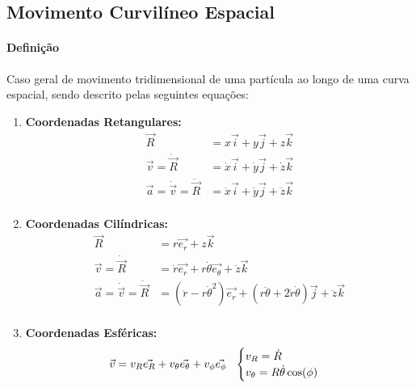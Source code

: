 \documentclass{article}
\begin{document}
        \subsection{Movimento Curvilíneo Espacial}
            \paragraph{Definição}Caso geral de movimento tridimensional de uma partícula ao longo de uma curva espacial, sendo descrito pelas seguintes equações:
                \begin{enumerate}[noitemsep]
                    \item \textbf{Coordenadas Retangulares:}
                        \begin{align*}
                            \vec{R} &= x\vec{i} + y\vec{j} + z\vec{k}\\
                            \vec{v} = \dot{\vec{R}} &= \dot{x}\vec{i} + \dot{y}\vec{j} + \dot{z}\vec{k}\\
                            \vec{a} = \dot{\vec{v}} = \ddot{\vec{R}} &= \ddot{x}\vec{i} + \ddot{y}\vec{j} + \ddot{z}\vec{k}\\
                        \end{align*}
                    \item \textbf{Coordenadas Cilíndricas:}
                        \begin{align*}
                            \vec{R} &= r\vec{e_{r}} + z\vec{k}\\
                            \vec{v} = \dot{\vec{R}} &= \dot{r}\vec{e_{r}} + r\dot{\theta}\vec{e_{\theta}} + \dot{z}\vec{k}\\
                            \vec{a} = \dot{\vec{v}} = \ddot{\vec{R}} &= (\ddot{r} - r\dot{\theta}^{2})\vec{e_{r}} + (r\ddot{\theta} + 2\dot{r}\dot{\theta})\vec{j} + \ddot{z}\vec{k}\\
                        \end{align*}
                    \item \textbf{Coordenadas Esféricas:}
                        \[
                            \vec{v} = v_{R}\vec{e_{R}} + v_{\theta}\vec{e_{\theta}} + v_{\phi}\vec{e_{\phi}}
                            \hspace{2.5mm}
                            \begin{cases}
                                v_{R} = \dot{R}\\
                                v_{\theta} = R\dot{\theta}\cos(\phi)\\

\end{cases}\]
\end{enumerate}
\end{document}
